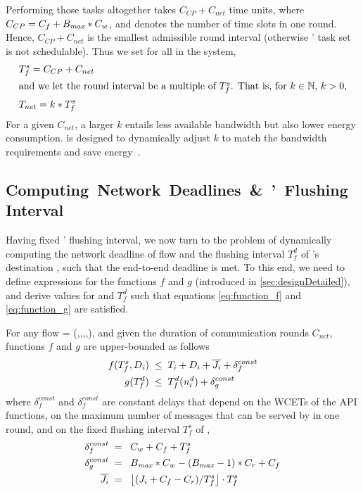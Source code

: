 Performing those tasks altogether takes $C_{CP} + C_{net}$ time units, where $C_{CP} = C_f + B_{\mathit{max}} * C_w$, and \nslotsmax denotes the number of time slots in one round.
Hence, $C_{CP} + C_{net}$ is the smallest admissible round interval (otherwise \CPs' task set is not schedulable). Thus we set for all \CPs in the system,
\begin{align}
\label{eq:design_flush_period_source}
	& T_f^s = C_{CP} + C_{net} \\
\intertext{and we let the round interval be a multiple of $T_f^s$. That is, for $k \in \mathbb{N}$, $k > 0$,}
\label{eq:design_round_period}
	& T_{net} = k * T_f^s
\end{align}
For a given $C_{net}$, a larger $k$ entails less available bandwidth but also lower energy consumption.
\blink is designed to dynamically adjust $k$ to match the bandwidth requirements and save energy~\cite{zimmerling2017Blink}.

\subsection{\mbox{Computing Network Deadlines \& \APs ' Flushing Interval}}
\label{subsec:D_Tfd_computation}

Having fixed \CPs' flushing interval, we now turn to the problem of dynamically computing the network deadline \ndeadlinei of flow \flowi and the flushing interval $T_f^d$ of \flowi's destination \apdst, such that the end-to-end deadline \deadlinei is met.
To this end, we need to define expressions for the functions $f$ and $g$ (introduced in \cref{sec:designDetailed}), and derive values for \ndeadlinei and $T_f^d$ such that equations \eqref{eq:function_f} and \eqref{eq:function_g} are satisfied.

\begin{theorem}
  \label{thm:delta}
  For any flow \flowi = (\flowsrci,\flowdsti,\periodi,\jitteri,\deadlinei), and given the duration of communication rounds $C_{net}$, functions $f$ and $g$ are upper-bounded as follows
  \begin{align}
  f(T_f^s ,  D_{\mathit{i}})
  	& \; \leq \;
  	T_i + D_i + \overline{J_{i}}  + \delta_f^{const} \label{eq:expression_f}\\
  g(T_f^d)
  	& \; \leq  \;
  	T_f^d(\mathit{n^d_{i}}) + \delta_g^{const} \label{eq:expression_g}
  \end{align}
  where $ \delta_f^{const}$ and $\delta_f^{const}$ are constant delays that depend on the WCETs of the \bolt API functions, on the maximum number of messages \nslotsmax that can be %
  served by \blink in one round, and on the fixed flushing interval $T_f^s$ of \CPs,
  \begin{align}
  \delta_f^{const} &\;= \;\; C_w + C_f + T_f^s \\
  \delta_g^{const} &\;= \;\;\nslotsmax*C_w - (\nslotsmax-1)* C_r + C_f\\
  \label{eq:jitter_bar}
  \overline{\jitteri}  &\;= \;\; \floor*{(\jitteri + C_f - C_r)/{T_f^s}}\cdot T_f^s
  \end{align}
\end{theorem}


